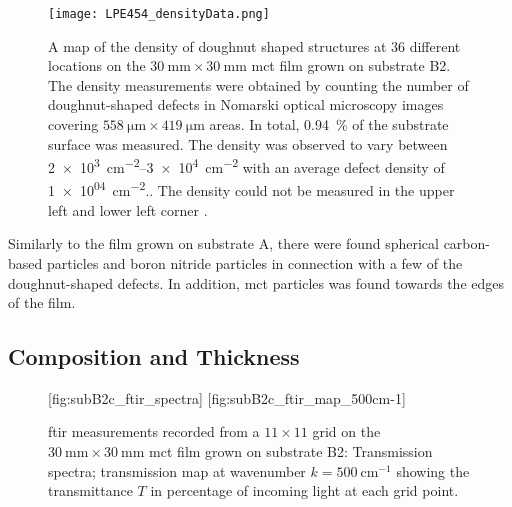 
\begin{figure}[htbp]
    \centering
    \texttt{[image: LPE454\_densityData.png]}
    \caption[Map of the density of doughnut shaped structures on the \ac{mct} film grown on substrate B2.]{A map of the density of doughnut shaped structures at 36 different locations on the $\SI{30}{\milli\metre}\times\SI{30}{\milli\metre}$ \ac{mct} film grown on substrate B2. The density measurements were obtained by counting the number of doughnut-shaped defects in Nomarski optical microscopy images covering $\SI{558}{\micro\metre}\times\SI{419}{\micro\metre}$ areas. In total, \SI{0.94}{\percent} of the substrate surface was measured. The density was observed to vary between \SIrange{2e+3}{3e+4}{\centi\metre^{-2}} with an average defect density of \SI{1e+04}{\centi\metre^{-2}}.. The density could not be measured in the upper left and lower left corner .}
    \label{fig:LPE454_densityData}
\end{figure}

Similarly to the film grown on substrate A, there were found spherical carbon-based particles and boron nitride particles in connection with a few of the doughnut-shaped defects. In addition, \ac{mct} particles was found towards the edges of the film.

\subsection{Composition and Thickness}


\begin{figure}[htbp]
    \centering
    [fig:subB2c_ftir_spectra]
    \hfill
    [fig:subB2c_ftir_map_500cm-1]
    \caption[\Ac{ftir} measurements of the \ac{mct} film grown on substrate B2.]{\Ac{ftir} measurements recorded from a $11\times11$ grid on the $\SI{30}{\milli\metre}\times\SI{30}{\milli\metre}$ \ac{mct} film grown on substrate B2:  Transmission spectra;  transmission map at wavenumber $k=\SI{500}{\centi\metre^{-1}}$ showing the transmittance $T$ in percentage of incoming light at each grid point.}
\end{figure}

